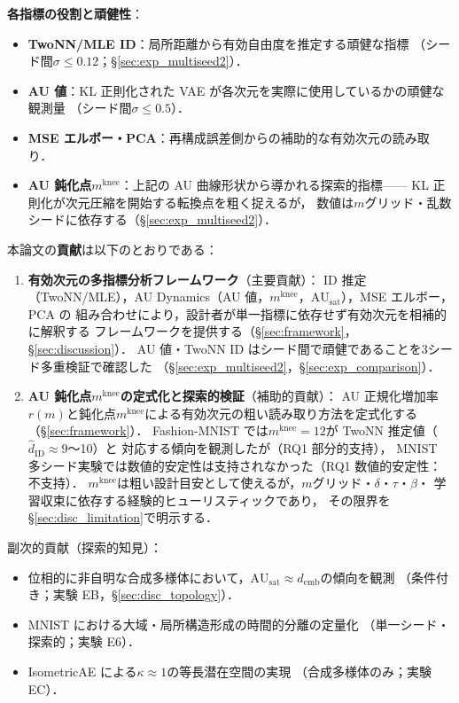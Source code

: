 \documentclass[11pt,a4paper]{jsarticle}
\newcommand{\kap}{\kappa}
\newcommand{\AUsat}{\mathrm{AU}_{\mathrm{sat}}}
\newcommand{\mknee}{m^{\mathrm{knee}}}
\newcommand{\demb}{d_{\mathrm{emb}}}
\begin{document}
\textbf{各指標の役割と頑健性}：
\begin{itemize}
  \item \textbf{TwoNN/MLE ID}：局所距離から有効自由度を推定する頑健な指標
        （シード間$\sigma \leq 0.12$；§\ref{sec:exp_multiseed2}）．
  \item \textbf{AU 値}：KL 正則化された VAE が各次元を実際に使用しているかの頑健な観測量
        （シード間$\sigma \leq 0.5$）．
  \item \textbf{MSE エルボー・PCA}：再構成誤差側からの補助的な有効次元の読み取り．
  \item \textbf{AU 鈍化点$\mknee$}：上記の AU 曲線形状から導かれる探索的指標——
        KL 正則化が次元圧縮を開始する転換点を粗く捉えるが，
        数値は$m$グリッド・乱数シードに依存する（§\ref{sec:exp_multiseed2}）．
\end{itemize}

本論文の\textbf{貢献}は以下のとおりである：
\begin{enumerate}
  \item \textbf{有効次元の多指標分析フレームワーク}（主要貢献）：
        ID 推定（TwoNN/MLE），AU Dynamics（AU 値，$\mknee$，$\AUsat$），MSE エルボー，PCA の
        組み合わせにより，設計者が単一指標に依存せず有効次元を相補的に解釈する
        フレームワークを提供する（§\ref{sec:framework}，§\ref{sec:discussion}）．
        AU 値・TwoNN ID はシード間で頑健であることを3シード多重検証で確認した
        （§\ref{sec:exp_multiseed2}，§\ref{sec:exp_comparison}）．
  \item \textbf{AU 鈍化点$\mknee$の定式化と探索的検証}（補助的貢献）：
        AU 正規化増加率$r(m)$と鈍化点$\mknee$による有効次元の粗い読み取り方法を定式化する
        （§\ref{sec:framework}）．
        Fashion-MNIST では$\mknee = 12$が TwoNN 推定値（$\hat{d}_\mathrm{ID} \approx 9$〜10）と
        対応する傾向を観測したが（RQ1 部分的支持），
        MNIST 多シード実験では数値的安定性は支持されなかった（RQ1 数値的安定性：不支持）．
        $\mknee$は粗い設計目安として使えるが，$m$グリッド・$\delta$・$\tau$・$\beta$・
        学習収束に依存する経験的ヒューリスティックであり，
        その限界を§\ref{sec:disc_limitation}で明示する．
\end{enumerate}

副次的貢献（探索的知見）：
\begin{itemize}
  \item 位相的に非自明な合成多様体において，$\AUsat \approx \demb$の傾向を観測
        （条件付き；実験 EB，§\ref{sec:disc_topology}）．
  \item MNIST における大域・局所構造形成の時間的分離の定量化
        （単一シード・探索的；実験 E6）．
  \item IsometricAE による$\kap \approx 1$の等長潜在空間の実現
        （合成多様体のみ；実験 EC）．
\end{itemize}
\end{document}
